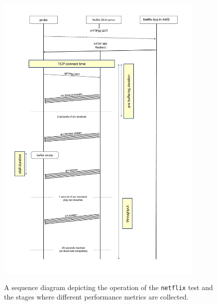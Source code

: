 \begin{figure}[!ht]
	\centering
	\includegraphics[keepaspectratio, height = 15cm, width=10cm]{figures/Netflix-Sequence-Diagram.pdf}
	\caption[Netflix Test Sequence Diagram]{A sequence diagram depicting the operation of the \texttt{netflix} test and the stages where different performance metrics are collected.}
	\label{fig:netflix test sequence diagram}
\end{figure}

